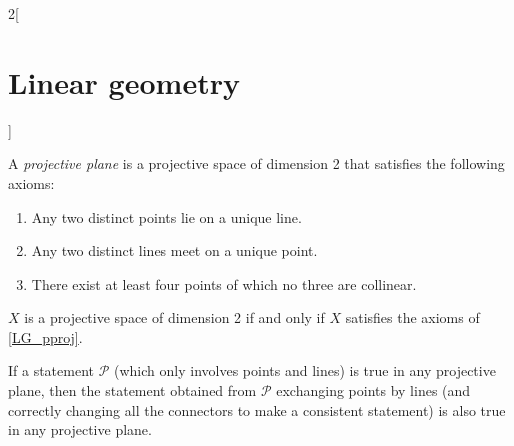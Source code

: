 \documentclass[../../../main.tex]{subfiles}
\begin{document}
\begin{multicols}{2}[\section{Linear geometry}]
\begin{definition}
    \end{definition}
    \begin{definition}\label{LG_pproj}
        A \textit{projective plane} is a projective space of dimension 2 that satisfies the following axioms:
        \begin{enumerate}
            \item Any two distinct points lie on a unique line.
            \item Any two distinct lines meet on a unique point.
            \item There exist at least four points of which no three are collinear.
        \end{enumerate}
    \end{definition}
    \begin{theorem}
        $X$ is a projective space of dimension 2 if and only if $X$ satisfies the axioms of \cref{LG_pproj}.
    \end{theorem}
    \begin{theorem}
        If a statement $\mathcal{P}$ (which only involves points and lines) is true in any projective plane, then the statement obtained from $\mathcal{P}$ exchanging points by lines (and correctly changing all the connectors to make a consistent statement) is also true in any projective plane.
    \end{theorem}

\end{multicols}
\end{document}
